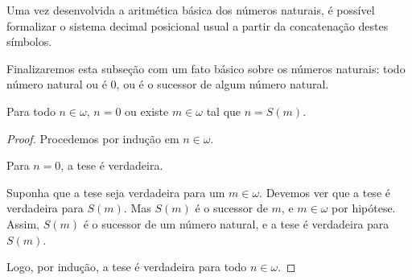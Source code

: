 Uma vez desenvolvida a aritmética básica dos números naturais, é possível formalizar o sistema decimal posicional usual a partir da concatenação destes símbolos.

Finalizaremos esta subseção com um fato básico sobre os números naturais: todo número natural ou é $0$, ou é o sucessor de algum número natural.

\begin{proposition}[$\BSTI$]\label{prop:todoNaturalEhZeroOuSucessor}
    Para todo $n \in \omega$, $n=0$ ou existe $m \in \omega$ tal que $n=S(m)$.
\end{proposition}
\begin{proof}
    Procedemos por indução em $n \in \omega$.
    
    Para $n=0$, a tese é verdadeira.
    
    Suponha que a tese seja verdadeira para um $m \in \omega$.
    Devemos ver que a tese é verdadeira para $S(m)$.
    Mas $S(m)$ é o sucessor de $m$, e $m \in \omega$ por hipótese.
    Assim, $S(m)$ é o sucessor de um número natural, e a tese é verdadeira para $S(m)$.

    Logo, por indução, a tese é verdadeira para todo $n \in \omega$.
\end{proof}
